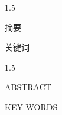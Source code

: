 

\begingroup
\pagestyle{empty}
\thispagestyle{empty}

\begin{spacing}{1.5}
    \centering
    \parbox[c]{0.85\textwidth}{\thesistitlefont \thesistitle}\par
    \vspace{\baselineskip}
    {\abszhname 摘\qquad 要\par}
\end{spacing}

\vspace{\baselineskip}
\normalsize
\abstractzh

\vspace{\baselineskip}
\par\abszhkey 关键词\quad \abszhkeys \keywordszh
\clearpage
\endgroup

\begingroup
\pagestyle{empty}
\thispagestyle{empty}

\begin{spacing}{1.5}
    \centering
    \parbox[c]{0.85\textwidth}{\thesistitleenfont \thesistitleen}\par
    \vspace{\baselineskip}
    {\absenname ABSTRACT\par}
\end{spacing}

\vspace{\baselineskip}
\normalsize
\abstracten

\vspace{\baselineskip}
\par\absenkey KEY WORDS\quad \absenkeys \keywordsen
\clearpage
\endgroup
